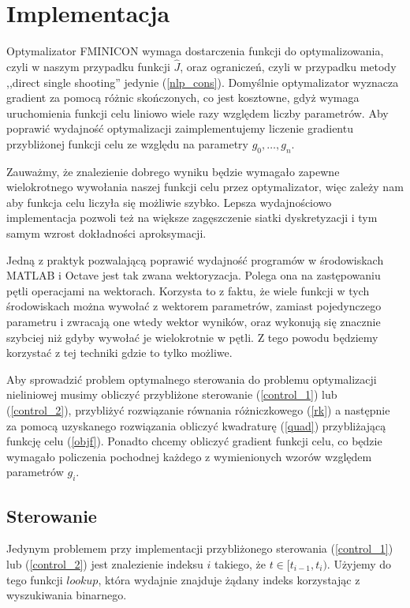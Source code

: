 \documentclass[11pt]{article}
\begin{document}
\section{Implementacja}
Optymalizator FMINICON wymaga dostarczenia funkcji do optymalizowania, czyli w naszym przypadku funkcji $\hat{J}$, oraz ograniczeń, czyli w przypadku metody ,,direct single shooting'' jedynie (\ref{nlp_cons}). Domyślnie optymalizator wyznacza gradient za pomocą różnic skończonych, co jest kosztowne, gdyż wymaga uruchomienia funkcji celu liniowo wiele razy względem liczby parametrów. Aby poprawić wydajność optymalizacji zaimplementujemy liczenie gradientu przybliżonej funkcji celu ze względu na parametry $g_0,\ldots, g_n$.

Zauważmy, że znalezienie dobrego wyniku będzie wymagało zapewne wielokrotnego wywołania naszej funkcji celu przez optymalizator, więc zależy nam aby funkcja celu liczyła się możliwie szybko. Lepsza wydajnościowo implementacja pozwoli też na większe zagęszczenie siatki dyskretyzacji i tym samym wzrost dokładności aproksymacji.

Jedną z praktyk pozwalającą poprawić wydajność programów w środowiskach MATLAB i Octave jest tak zwana wektoryzacja. Polega ona na zastępowaniu pętli operacjami na wektorach. Korzysta to z faktu, że wiele funkcji w tych środowiskach można wywołać z wektorem parametrów, zamiast pojedynczego parametru i zwracają one wtedy wektor wyników, oraz wykonują się znacznie szybciej niż gdyby wywołać je wielokrotnie w pętli. Z tego powodu będziemy korzystać z tej techniki gdzie to tylko możliwe.

Aby sprowadzić problem optymalnego sterowania do problemu optymalizacji nieliniowej musimy obliczyć przybliżone sterowanie (\ref{control_1}) lub (\ref{control_2}), przybliżyć rozwiązanie równania różniczkowego (\ref{rk}) a następnie za pomocą uzyskanego rozwiązania obliczyć kwadraturę (\ref{quad}) przybliżającą funkcję celu (\ref{objf}). Ponadto chcemy obliczyć gradient funkcji celu, co będzie wymagało policzenia pochodnej każdego z wymienionych wzorów względem parametrów $g_i$.

\subsection{Sterowanie}\label{subsec_sterowanie}
Jedynym problemem przy implementacji przybliżonego sterowania (\ref{control_1}) lub (\ref{control_2}) jest znalezienie indeksu $i$ takiego, że $t \in [t_{i-1}, t_i)$. Użyjemy do tego funkcji $lookup$, która wydajnie znajduje żądany indeks korzystając z wyszukiwania binarnego.
\end{document}
